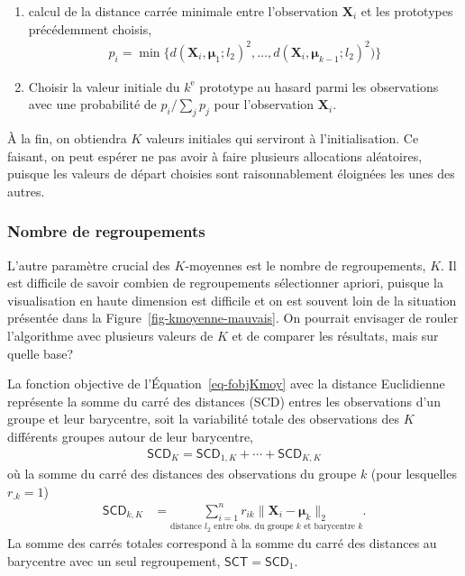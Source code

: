\documentclass[
  11pt,
  letterpaper,
]{scrbook}
\providecommand{\tightlist}{%
  \setlength{\itemsep}{0pt}\setlength{\parskip}{0pt}}\usepackage{longtable,booktabs,array}
\theoremstyle{definition}
\theoremstyle{remark}
\begin{document}
\begin{enumerate}
\def\labelenumi{\arabic{enumi}.}
\tightlist
\item
  calcul de la distance carrée minimale entre l'observation
  \(\mathbf{X}_i\) et les prototypes précédemment choisis,
  \begin{align*}
  p_i = \min \{d(\mathbf{X}_i, \boldsymbol{\mu}_1; l_2)^2, \ldots, d(\mathbf{X}_i, \boldsymbol{\mu}_{k-1}; l_2)^2)\}
  \end{align*}
\item
  Choisir la valeur initiale du \(k^{\text{e}}\) prototype au hasard
  parmi les observations avec une probabilité de \(p_i/\sum_{j} p_j\)
  pour l'observation \(\mathbf{X}_i\).
\end{enumerate}

À la fin, on obtiendra \(K\) valeurs initiales qui serviront à
l'initialisation. Ce faisant, on peut espérer ne pas avoir à faire
plusieurs allocations aléatoires, puisque les valeurs de départ choisies
sont raisonnablement éloignées les unes des autres.

\hypertarget{nombre-de-regroupements}{%
\subsubsection*{Nombre de regroupements}\label{nombre-de-regroupements}}

L'autre paramètre crucial des \(K\)-moyennes est le nombre de
regroupements, \(K\). Il est difficile de savoir combien de
regroupements sélectionner apriori, puisque la visualisation en haute
dimension est difficile et on est souvent loin de la situation présentée
dans la Figure~\ref{fig-kmoyenne-mauvais}. On pourrait envisager de
rouler l'algorithme avec plusieurs valeurs de \(K\) et de comparer les
résultats, mais sur quelle base?

La fonction objective de l'Équation~\ref{eq-fobjKmoy} avec la distance
Euclidienne représente la somme du carré des distances (SCD) entres les
observations d'un groupe et leur barycentre, soit la variabilité totale
des observations des \(K\) différents groupes autour de leur barycentre,
\begin{align*}
\mathsf{SCD}_K = \mathsf{SCD}_{1,K} + \cdots + \mathsf{SCD}_{K,K}
\end{align*} où la somme du carré des distances des observations du
groupe \(k\) (pour lesquelles \(r_{.k}=1\)) \begin{align*}
\mathsf{SCD}_{k,K} &= \underset{\mbox{distance $l_2$ entre obs. du groupe $k$ et barycentre $k$}}{\sum_{i=1}^n r_{ik}\|\mathbf{X}_i -  \boldsymbol{\mu}_{k}\|_2}.
\end{align*} La somme des carrés totales correspond à la somme du carré
des distances au barycentre avec un seul regroupement,
\(\mathsf{SCT} = \mathsf{SCD}_{1}\).
\end{document}
